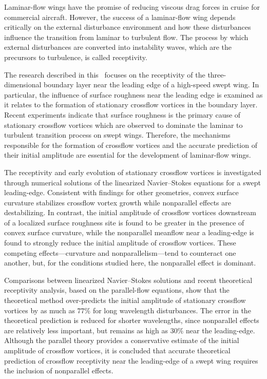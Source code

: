 %
%
%
%
%

Laminar-flow wings have the promise of reducing viscous drag forces in cruise
for commercial aircraft.  However, the success of a laminar-flow wing depends
critically on the external disturbance environment and how these disturbances
influence the transition from laminar to turbulent flow.  The process by which
external disturbances are converted into instability waves, which are the
precursors to turbulence, is called receptivity.

The research described in this \thesis\ focuses on the receptivity of the
three-dimensional boundary layer near the leading edge of a high-speed swept
wing.  In particular, the influence of surface roughness near the leading edge
is examined as it relates to the formation of stationary crossflow vortices in
the boundary layer.  Recent experiments indicate that surface roughness is the
primary cause of stationary crossflow vortices which are observed to dominate
the laminar to turbulent transition process on swept wings.  Therefore, the
mechanisms responsible for the formation of crossflow vortices and the
accurate prediction of their initial amplitude are essential for the
development of laminar-flow wings.

The receptivity and early evolution of stationary crossflow vortices is
investigated \linebreak through numerical solutions of the linearized
Navier--Stokes equations for a swept leading-edge.  Consistent with findings
for other geometries, convex surface curvature stabilizes crossflow vortex
growth while nonparallel effects are destabilizing.  In contrast, the initial
amplitude of crossflow vortices downstream of a localized surface roughness
site is found to be greater in the presence of convex surface curvature, while
the nonparallel meanflow near a leading-edge is found to strongly reduce the
initial amplitude of crossflow vortices.  These competing effects---curvature
and nonparallelism---tend to counteract one another, but, for the conditions
studied here, the nonparallel effect is dominant.

Comparisons between linearized Navier--Stokes solutions and recent theoretical
receptivity analysis, based on the parallel-flow equations, show that the
theoretical method over-predicts the initial amplitude of stationary crossflow
vortices by as much as $77\%$ for long wavelength disturbances.  The error in
the theoretical prediction is reduced for shorter wavelengths, since
nonparallel effects are relatively less important, but remains as high as
$30\%$ near the leading-edge.  Although the parallel theory provides a
conservative estimate of the initial amplitude of crossflow vortices, it is
concluded that accurate theoretical prediction of crossflow receptivity near
the leading-edge of a swept wing requires the inclusion of nonparallel
effects.